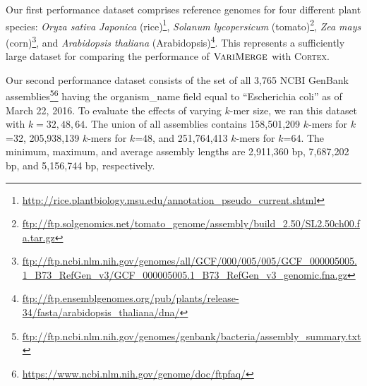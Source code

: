 Our first performance dataset comprises reference genomes for four different plant species:
\emph{Oryza sativa Japonica} (rice)\footnote{\url{http://rice.plantbiology.msu.edu/annotation_pseudo_current.shtml}}\citep{rice},
\emph{Solanum lycopersicum} (tomato)\footnote{\url{ftp://ftp.solgenomics.net/tomato_genome/assembly/build_2.50/SL2.50ch00.fa.tar.gz}}\citep{tomato1,tomato2},
\emph{Zea mays} (corn)\footnote{\url{ftp://ftp.ncbi.nlm.nih.gov/genomes/all/GCF/000/005/005/GCF_000005005.1_B73_RefGen_v3/GCF_000005005.1_B73_RefGen_v3_genomic.fna.gz}}\citep{corn}, and
\emph{Arabidopsis thaliana} (Arabidopsis)\footnote{\url{ftp://ftp.ensemblgenomes.org/pub/plants/release-34/fasta/arabidopsis_thaliana/dna/}}\citep{swarbreck}.
This represents a sufficiently large dataset for comparing the performance of $\mbox{\rm {\sc VariMerge}}$ with \textsc{Cortex}.


Our second performance dataset consists of the set of all 3,765  NCBI GenBank assemblies\footnote{\url{ftp://ftp.ncbi.nlm.nih.gov/genomes/genbank/bacteria/assembly_summary.txt}}\footnote{\url{https://www.ncbi.nlm.nih.gov/genome/doc/ftpfaq/}} having the organism\_name field equal to ``Escherichia coli'' as of March 22, 2016.  To evaluate the effects of varying $k$-mer size, we ran this dataset with $k={32,48,64}$.  The union of all assemblies contains 158,501,209 $k$-mers for $k$=32, 205,938,139 $k$-mers for $k$=48, and 251,764,413 $k$-mers for $k$=64.  The minimum, maximum, and average assembly lengths are 2,911,360 bp, 7,687,202 bp, and 5,156,744 bp, respectively.



